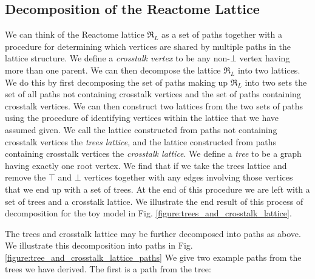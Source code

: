 \documentclass{article}
\newcommand{\var}[1]{\DTLfetch{mydata}{thekey}{#1}{thevalue}}
\newcounter{ctr}
\begin{document}
\subsection{Decomposition of the Reactome Lattice}

We can think of the Reactome lattice $\mathfrak R_L$ as a set of paths together with a procedure for determining which vertices are shared by multiple paths in the lattice structure. We define a \textit{crosstalk vertex} to be any non-$\bot$ vertex having more than one parent. We can then decompose the lattice $\mathfrak R_L$ into two lattices. We do this by first decomposing the set of paths making up $\mathfrak R_L$ into two sets \textemdash the set of all paths not containing crosstalk vertices and the set of paths containing crosstalk vertices. We can then construct two lattices from the two sets of paths using the procedure of identifying vertices within the lattice that we have assumed given. We call the lattice constructed from paths not containing crosstalk vertices the \textit{trees lattice}, and the lattice constructed from paths containing crosstalk vertices the \textit{crosstalk lattice}. We define a \textit{tree} to be a graph having exactly one root vertex. We find that if we take the trees lattice and remove the $\top$ and $\bot$ vertices together with any edges involving those vertices that we end up with a set of trees. At the end of this procedure we are left with a set of trees and a crosstalk lattice. We illustrate the end result of this process of decomposition for the toy model in Fig. \ref{figure:trees_and_crosstalk_lattice}.

\let\dataval\undefined

\setcounter{ctr}{0}
\newcommand{\dataval}{example_signal_transduction_tree_path_id\the\numexpr\value{ctr}\relax}

The trees and crosstalk lattice may be further decomposed into paths as above. We illustrate this decomposition into paths in Fig. \ref{figure:tree_and_crosstalk_lattice_paths} We give two example paths from the trees we have derived. The first is a path from the \var{\dataval} tree: \\

\let\dataval\undefined
\end{document}
